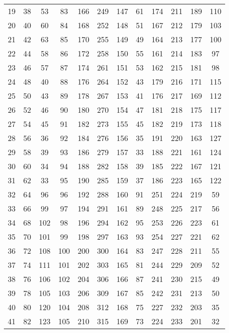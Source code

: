 \begin{longtable}{ccc|ccc|ccc|ccc}
  19 & 38  & 53  & 83  & 166 & 249 & 147 & 61  & 174 & 211 & 189 & 110 \\
  20 & 40  & 60  & 84  & 168 & 252 & 148 & 51  & 167 & 212 & 179 & 103 \\
  21 & 42  & 63  & 85  & 170 & 255 & 149 & 49  & 164 & 213 & 177 & 100 \\
  22 & 44  & 58  & 86  & 172 & 258 & 150 & 55  & 161 & 214 & 183 & 97  \\
  23 & 46  & 57  & 87  & 174 & 261 & 151 & 53  & 162 & 215 & 181 & 98  \\
  24 & 48  & 40  & 88  & 176 & 264 & 152 & 43  & 179 & 216 & 171 & 115 \\
  25 & 50  & 43  & 89  & 178 & 267 & 153 & 41  & 176 & 217 & 169 & 112 \\
  26 & 52  & 46  & 90  & 180 & 270 & 154 & 47  & 181 & 218 & 175 & 117 \\
  27 & 54  & 45  & 91  & 182 & 273 & 155 & 45  & 182 & 219 & 173 & 118 \\
  28 & 56  & 36  & 92  & 184 & 276 & 156 & 35  & 191 & 220 & 163 & 127 \\
  29 & 58  & 39  & 93  & 186 & 279 & 157 & 33  & 188 & 221 & 161 & 124 \\
  30 & 60  & 34  & 94  & 188 & 282 & 158 & 39  & 185 & 222 & 167 & 121 \\
  31 & 62  & 33  & 95  & 190 & 285 & 159 & 37  & 186 & 223 & 165 & 122 \\
  32 & 64  & 96  & 96  & 192 & 288 & 160 & 91  & 251 & 224 & 219 & 59  \\
  33 & 66  & 99  & 97  & 194 & 291 & 161 & 89  & 248 & 225 & 217 & 56  \\
  34 & 68  & 102 & 98  & 196 & 294 & 162 & 95  & 253 & 226 & 223 & 61  \\
  35 & 70  & 101 & 99  & 198 & 297 & 163 & 93  & 254 & 227 & 221 & 62  \\
  36 & 72  & 108 & 100 & 200 & 300 & 164 & 83  & 247 & 228 & 211 & 55  \\
  37 & 74  & 111 & 101 & 202 & 303 & 165 & 81  & 244 & 229 & 209 & 52  \\
  38 & 76  & 106 & 102 & 204 & 306 & 166 & 87  & 241 & 230 & 215 & 49  \\
  39 & 78  & 105 & 103 & 206 & 309 & 167 & 85  & 242 & 231 & 213 & 50  \\
  40 & 80  & 120 & 104 & 208 & 312 & 168 & 75  & 227 & 232 & 203 & 35  \\
  41 & 82  & 123 & 105 & 210 & 315 & 169 & 73  & 224 & 233 & 201 & 32  \\

\end{longtable}
